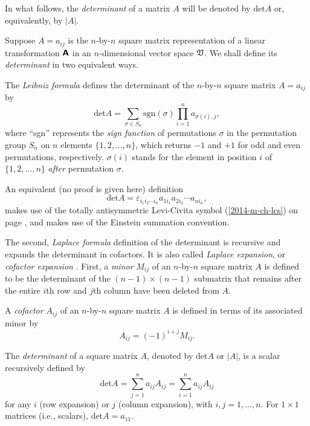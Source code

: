 In what follows, the {\em determinant} of a matrix $A$ will be denoted by $\textrm{det} A$ or,
equivalently, by $\vert A \vert$.

Suppose $A=a_{ij}$ is the  $n$-by-$n$ square matrix representation of
a linear transformation $\textsf{\textbf{A}}$
in an $n$-dimensional vector space ${\frak V}$.
We shall define its {\em determinant}
in two equivalent ways.


The
{\em Leibniz formula}
 defines the determinant of the $n$-by-$n$ square matrix  $A=a_{ij}$ by
\begin{equation}
\textrm{det}A
=\sum_{\sigma \in S_n} \textrm{sgn}(\sigma) \prod_{i=1}^n a_{\sigma(i),j} ,
\end{equation}
where ``sgn'' represents the {\em sign function}
of permutations $\sigma$ in the permutation group $S_n$
on $n$ elements $\{1,2, \ldots , n\}$,
which returns $-1$ and $+1$ for odd and even permutations,
respectively.
$\sigma (i)$ stands for the element in position $i$ of $\{1,2, \ldots , n\}$ {\em after} permutation $\sigma$.

An equivalent (no proof is given here) definition
\begin{equation}
\textrm{det}A
=\varepsilon_{i_1 i_2\cdots i_n} a_{1i_1}a_{2i_2} \cdots a_{ni_n},
\end{equation}
makes use of the  totally antisymmetric Levi-Civita symbol  (\ref{2014-m-ch-lcs}) on page \pageref{2014-m-ch-lcs},
 and makes use of the
 Einstein summation convention.


The second,
{\em Laplace formula}
definition of the determinant
is recursive and expands the determinant in cofactors.
It is also called
{\em Laplace expansion},
or
{\em cofactor expansion}
.
First,
a {\em minor}
$M_{ij}$ of an  $n$-by-$n$ square matrix  $A$ is
defined to be the determinant of the
$(n-1)\times (n-1)$ submatrix
that remains after the entire $i$th row and $j$th column have been deleted from $A$.

A {\em cofactor}
$A_{ij}$
of an $n$-by-$n$ square matrix  $A$
is defined in terms of its associated minor by
\begin{equation}
A_{ij}=(-1)^{i+j}M_{ij}.
\end{equation}

The {\em determinant} of a square matrix $A$, denoted by
$\textrm{det} A$ or $\vert A\vert$, is a scalar recursively defined by
\begin{equation}
\textrm{det}A
=\sum_{j=1}^n a_{ij}A_{ij}
=\sum_{i=1}^n a_{ij}A_{ij}
\end{equation}
for any $i$ (row expansion) or $j$ (column expansion), with $i,j=1,\ldots ,n$.
For $1\times 1$ matrices (i.e., scalars), $\textrm{det}A =a_{11}$.

